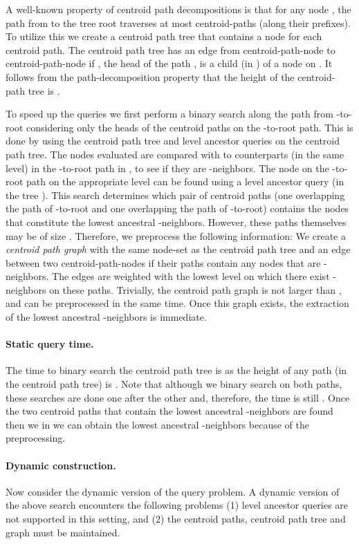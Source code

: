 \documentclass[11pt]{article}
\begin{document}
A well-known property of centroid path decompositions is
that for any node , the path from  to the tree root
traverses at most  centroid-paths (along their prefixes). To
utilize this we create a centroid path tree that contains a node for each
centroid path. The centroid path tree has an edge from centroid-path-node  to
centroid-path-node  if , the head of the path , is a child (in
) of a node on . It follows from the path-decomposition property
that the height of the centroid-path tree is .

To speed up the queries we first perform a binary search along the path from -to-root 
considering only the  heads of the centroid paths on the -to-root path. 
This is done by using the centroid path tree and level ancestor queries on the centroid 
path tree. The nodes evaluated are compared with to counterparts (in the same level) in 
the -to-root path in , to see if they are -neighbors. The node on the 
-to-root path on the appropriate level can be found using a level ancestor query (in 
the tree ). This search determines which pair of centroid paths (one overlapping the 
path of -to-root and one overlapping the path of -to-root) contains the nodes that 
constitute the lowest ancestral -neighbors. However, these paths themselves may be of 
size . Therefore, we preprocess the following information: We create a {\em 
centroid path graph} with the same node-set as the centroid path tree and an edge 
between two centroid-path-nodes if their paths contain any nodes that are -neighbors. 
The edges are weighted with the lowest level on which there exist -neighbors on these 
paths. Trivially, the centroid path graph is not larger than , and can be
preprocessed in the same time. Once this graph exists, the extraction of the 
lowest ancestral -neighbors is immediate.

\paragraph{Static query time.}
The time to binary search the centroid path tree is  as the height of any path (in the centroid path tree) is . Note that although we binary search on both paths, these searches are
done one after the other and, therefore, the time is still . Once the two centroid paths that contain the lowest ancestral
-neighbors are found then we in  we can obtain the lowest
ancestral -neighbors because of the preprocessing.

\paragraph{Dynamic construction.}
Now consider the dynamic version of the query problem. A dynamic version
of the above search encounters the following problems
(1) level ancestor queries are not supported in this setting, and
(2) the centroid paths, centroid path tree and graph must be maintained.
\end{document}
